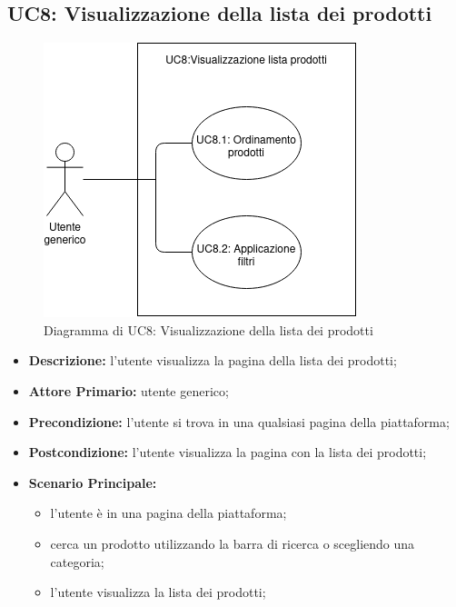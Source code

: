 \subsection{UC8: Visualizzazione della lista dei prodotti}
\label{sec:UC8}
\begin{figure}[!ht]
    \caption{Diagramma di UC8: Visualizzazione della lista dei prodotti}
    \vspace{10px}
    \includegraphics[scale=0.5]{../../../Images/AnalisiRequisiti/UC08.png}
    \centering
\end{figure}
\begin{itemize}
    \item \textbf{Descrizione:} l'utente visualizza la pagina della lista dei prodotti;
    \item \textbf{Attore Primario:} utente generico;
    \item \textbf{Precondizione:} l'utente si trova in una qualsiasi pagina della piattaforma;
    \item \textbf{Postcondizione:} l'utente visualizza la pagina con la lista dei prodotti;
    \item \textbf{Scenario Principale:}
          \begin{itemize}
              \item l'utente è in una pagina della piattaforma;
              \item cerca un prodotto utilizzando la barra di ricerca o scegliendo una categoria;
              \item l'utente visualizza la lista dei prodotti;
          \end{itemize}
\end{itemize}
